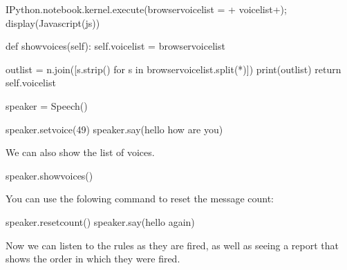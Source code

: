 \documentclass[letterpaper,10pt,english]{sphinxmanual}
\begin{document}
{\begin{sphinxVerbatim}[commandchars=\\\{\}]
IPython.notebook.kernel.execute(\PYGZdq{}\PYGZus{}browser\PYGZus{}voicelist = \PYGZsq{}\PYGZdq{}+ voicelist+\PYGZdq{}\PYGZsq{}\PYGZdq{});
        \PYGZsq{}\PYGZsq{}\PYGZsq{}
        display(Javascript(js))

    def show\PYGZus{}voices(self):
        self.voicelist = \PYGZus{}browser\PYGZus{}voicelist

        outlist = \PYGZsq{}\PYGZbs{}n\PYGZsq{}.join([s.strip() for s in \PYGZus{}browser\PYGZus{}voicelist.split(\PYGZsq{}*\PYGZsq{})])
        print(outlist)
        \PYGZsh{}return self.voicelist
\end{sphinxVerbatim}
}

{
\begin{sphinxVerbatim}[commandchars=\\\{\}]
\llap{\color{nbsphinxin}[ ]:\,\hspace{\fboxrule}\hspace{\fboxsep}}speaker = Speech()

\PYGZsh{}speaker.set\PYGZus{}voice(49)
speaker.say(\PYGZsq{}hello how are you\PYGZsq{})
\end{sphinxVerbatim}
}

We can also show the list of voices.

{
\begin{sphinxVerbatim}[commandchars=\\\{\}]
\llap{\color{nbsphinxin}[ ]:\,\hspace{\fboxrule}\hspace{\fboxsep}}speaker.show\PYGZus{}voices()
\end{sphinxVerbatim}
}

You can use the folowing command to reset the message count:

{
\begin{sphinxVerbatim}[commandchars=\\\{\}]
\llap{\color{nbsphinxin}[ ]:\,\hspace{\fboxrule}\hspace{\fboxsep}}speaker.reset\PYGZus{}count()
speaker.say(\PYGZsq{}hello again\PYGZsq{})
\end{sphinxVerbatim}
}

Now we can listen to the rules as they are fired, as well as seeing a report that shows the order in which they were fired.
\end{document}
